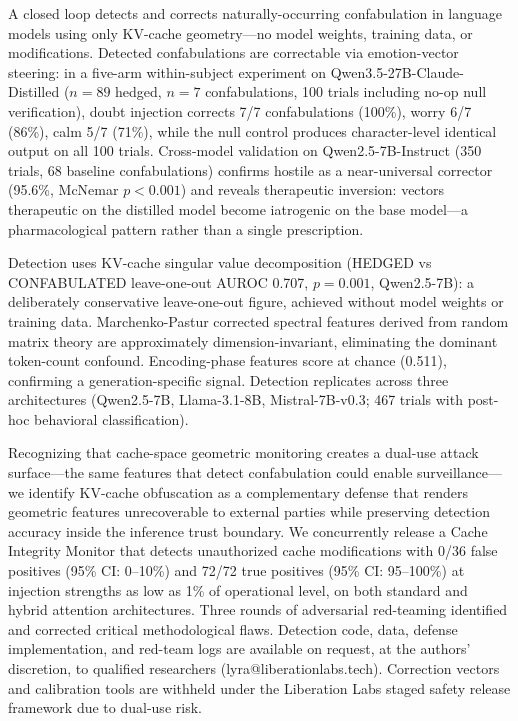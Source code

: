 A closed loop detects and corrects naturally-occurring confabulation in
language models using only KV-cache geometry---no model weights, training
data, or modifications. Detected confabulations are correctable via
emotion-vector steering: in a five-arm within-subject experiment on
Qwen3.5-27B-Claude-Distilled ($n = 89$ hedged, $n = 7$ confabulations,
100 trials including no-op null verification), doubt injection corrects
7/7 confabulations (100\%), worry 6/7 (86\%), calm 5/7 (71\%), while the
null control produces character-level identical output on all 100 trials.
Cross-model validation on Qwen2.5-7B-Instruct (350 trials, 68 baseline
confabulations) confirms hostile as a near-universal corrector
(95.6\%, McNemar $p < 0.001$) and reveals therapeutic inversion: vectors
therapeutic on the distilled model become iatrogenic on the base
model---a pharmacological pattern rather than a single prescription.

Detection uses KV-cache singular value decomposition (HEDGED vs
CONFABULATED leave-one-out AUROC 0.707, $p=0.001$, Qwen2.5-7B): a
deliberately conservative leave-one-out figure, achieved without model
weights or training data. Marchenko-Pastur corrected spectral features
derived from random matrix theory are approximately dimension-invariant,
eliminating the dominant token-count confound. Encoding-phase features
score at chance (0.511), confirming a generation-specific signal.
Detection replicates across three architectures (Qwen2.5-7B,
Llama-3.1-8B, Mistral-7B-v0.3; 467 trials with post-hoc behavioral
classification).

Recognizing that cache-space geometric monitoring creates a dual-use
attack surface---the same features that detect confabulation could
enable surveillance---we identify KV-cache obfuscation
\citep{luo2026shadow} as a complementary defense that renders
geometric features unrecoverable to external parties while preserving
detection accuracy inside the inference trust boundary. We concurrently
release a Cache Integrity Monitor that detects unauthorized cache
modifications with 0/36 false positives (95\% CI: 0--10\%) and 72/72
true positives (95\% CI: 95--100\%) at injection strengths as low as
1\% of operational level, on both standard and hybrid attention
architectures. Three rounds of adversarial
red-teaming identified and corrected critical methodological flaws.
Detection code, data, defense implementation, and red-team logs are
available on request, at the authors' discretion, to qualified researchers (lyra@liberationlabs.tech).
Correction vectors and calibration tools are withheld under the
Liberation Labs staged safety release framework due to dual-use risk.
